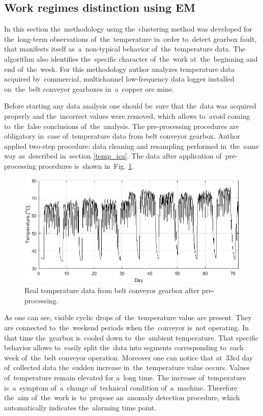 \subsection{Work regimes distinction using EM}\label{temp_em}

In this section the~methodology using the~clustering method was developed for the~long-term observations of~the~temperature in~order to~detect gearbox fault, that manifests itself as~a~non-typical behavior of~the~temperature data. The algorithm also identifies the~specific character of~the~work at~the~beginning and end of~the~week. For this methodology author analyzes temperature data acquired by~commercial, multichannel low-frequency data logger installed on~the~belt conveyor gearboxes in~a~copper ore mine.

Before starting any data analysis one should be~sure that the~data was acquired properly and the~incorrect values were removed, which allows to~avoid coming to~the~false conclusions of~the~analysis. The pre-processing procedures are obligatory in~case of~temperature data from belt conveyor gearbox. Author applied two-step procedure: data cleaning and resampling performed in~the~same way as~described in~section \ref{temp_ica}. The data after application of~pre-processing procedures is~shown in~Fig. \ref{fig: L222_55_data}.

\begin{figure}[ht!]
\centering
\includegraphics[width = 1\textwidth]{wykresy/L222_55_data.png}
\caption{Real temperature data from belt conveyor gearbox after pre-processing.}
\label{fig: L222_55_data}
\end{figure}

As one can see, visible cyclic drops of~the~temperature value are present. They are connected to~the~weekend periods when the~conveyor is~not operating. In that time the~gearbox is~cooled down to~the~ambient temperature. That specific behavior allows to~easily split the~data into segments corresponding to~each week of~the~belt conveyor operation. Moreover one can notice that at~$33$rd day of~collected data the~sudden increase in~the~temperature value occurs. Values of~temperature remain elevated for a~long time. The increase of~temperature is~a~symptom of~a~change of~technical condition of~a~machine. Therefore the~aim of~the~work is~to~propose an~anomaly detection procedure, which automatically indicates the~alarming time point.

